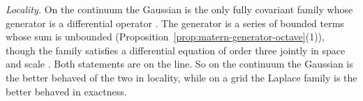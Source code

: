 \emph{Locality.} On the continuum the Gaussian is the only fully covariant family whose generator
is a differential operator . The \Matern{} generator is a series
of bounded terms whose sum is unbounded (Proposition~\ref{prop:matern-generator-octave}(1)),
though the \Matern{} family satisfies a differential equation of order three jointly in space and
scale . Both statements are on the line. So on the continuum the
Gaussian is the better behaved of the two in locality, while on a grid the Laplace family is the
better behaved in exactness.
